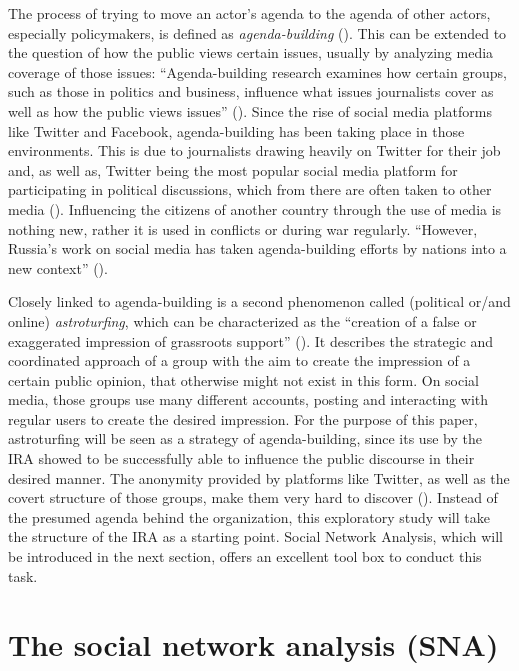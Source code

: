 \documentclass[12pt, titlepage=true, toc=bib]{scrartcl}
\begin{document}
The process of trying to move an actor's agenda to the agenda of other actors, especially policymakers, is defined as \textit{agenda-building} (\cite[3]{linvill_troll_2018}). This can be extended to the question of how the public views certain issues, usually by analyzing media coverage of those issues: ``Agenda-building research examines how certain groups, such as those in politics and business, influence what issues journalists cover as well as how the public views issues'' (\cite[434]{parmelee_agenda-building_2014}). Since the rise of social media platforms like Twitter and Facebook, agenda-building has been taking place in those environments. This is due to journalists drawing heavily on Twitter for their job and, as well as, Twitter being the most popular social media platform for participating in political discussions, which from there are often taken to other media (\cite[435, 437]{parmelee_agenda-building_2014}). Influencing the citizens of another country through the use of media is nothing new, rather it is used in conflicts or during war regularly. ``However, Russia's work on social media has taken agenda-building efforts by nations into a new context'' (\cite[3]{linvill_troll_2018}).

Closely linked to agenda-building is a second phenomenon called (political or/and online) \textit{astroturfing}, which can be characterized as the ``creation of a false or exaggerated impression of grassroots support'' (\cite{harcup_astroturfing_2014}). It describes the strategic and coordinated approach of a group with the aim to create the impression of a certain public opinion, that otherwise might not exist in this form. On social media, those groups use many different accounts, posting and interacting with regular users to create the desired impression. For the purpose of this paper, astroturfing will be seen as a strategy of agenda-building, since its use by the IRA showed to be successfully able to influence the public discourse in their desired manner. The anonymity provided by platforms like Twitter, as well as the covert structure of those groups, make them very hard to discover (\cite[564]{yang_how_2017}). Instead of the presumed agenda behind the organization, this exploratory study will take the structure of the IRA as a starting point. Social Network Analysis, which will be introduced in the next section, offers an excellent tool box to conduct this task.


\section{The social network analysis (SNA)}
\end{document}
